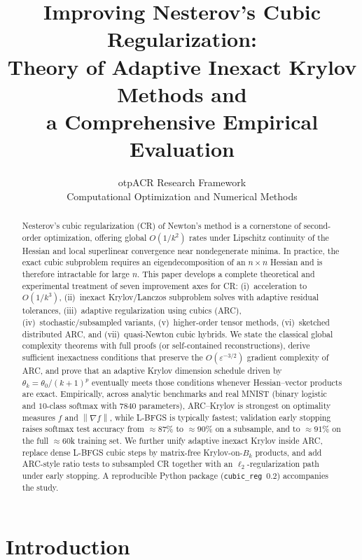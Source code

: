 \documentclass[11pt,a4paper]{article}
\title{\textbf{Improving Nesterov's Cubic Regularization:\\
Theory of Adaptive Inexact Krylov Methods and\\
a Comprehensive Empirical Evaluation}}
\author{otpACR Research Framework\\
\small Computational Optimization and Numerical Methods}
\date{}
\newcommand{\norm}[1]{\left\|#1\right\|}
\newcommand{\grad}{\nabla}
\begin{document}
\maketitle

\begin{abstract}
Nesterov's cubic regularization (CR) of Newton's method is a cornerstone of second-order optimization, offering global $O(1/k^{2})$ rates under Lipschitz continuity of the Hessian and local superlinear convergence near nondegenerate minima.
In practice, the exact cubic subproblem requires an eigendecomposition of an $n\times n$ Hessian and is therefore intractable for large $n$.
This paper develops a complete theoretical and experimental treatment of seven improvement axes for CR: (i)~acceleration to $O(1/k^{3})$, (ii)~inexact Krylov/Lanczos subproblem solves with adaptive residual tolerances, (iii)~adaptive regularization using cubics (ARC), (iv)~stochastic/subsampled variants, (v)~higher-order tensor methods, (vi)~sketched distributed ARC, and (vii)~quasi-Newton cubic hybrids.
We state the classical global complexity theorems with full proofs (or self-contained reconstructions), derive sufficient inexactness conditions that preserve the $O(\varepsilon^{-3/2})$ gradient complexity of ARC, and prove that an adaptive Krylov dimension schedule driven by $\theta_{k}=\theta_{0}/(k+1)^{p}$ eventually meets those conditions whenever Hessian--vector products are exact.
Empirically, across analytic benchmarks and real MNIST (binary logistic and $10$-class softmax with $7840$ parameters), ARC--Krylov is strongest on optimality measures $f$ and $\norm{\grad f}$, while L-BFGS is typically fastest; validation early stopping raises softmax test accuracy from $\approx 87\%$ to $\approx 90\%$ on a subsample, and to $\approx 91\%$ on the full $\approx 60$k training set.
We further unify adaptive inexact Krylov inside ARC, replace dense L-BFGS cubic steps by matrix-free Krylov-on-$B_{k}$ products, and add ARC-style ratio tests to subsampled CR together with an $\ell_{2}$-regularization path under early stopping.
A reproducible Python package (\texttt{cubic\_reg}~$0.2$) accompanies the study.
\end{abstract}

\tableofcontents
\newpage

\section{Introduction}
\end{document}
